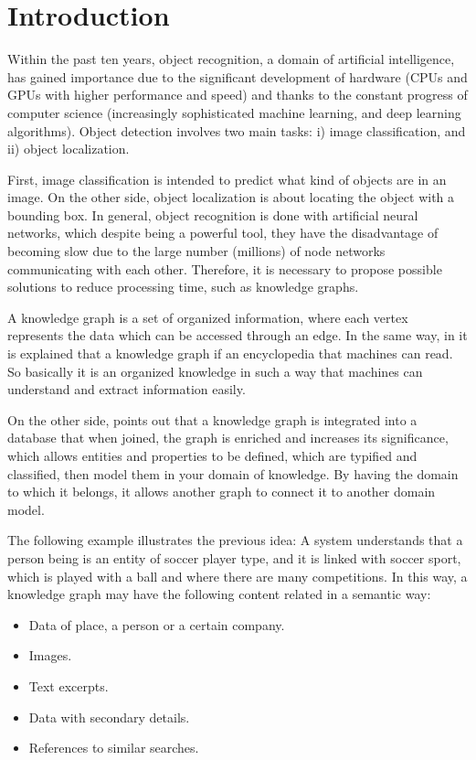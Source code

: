 \section{Introduction}
Within the past ten years, object recognition, a domain of artificial intelligence, has gained importance due to the significant development of hardware (CPUs and GPUs with higher performance and speed) and thanks to the constant progress of computer science (increasingly sophisticated machine learning, and deep learning algorithms). Object detection involves two main tasks: i) image classification, and ii) object localization.

First, image classification is intended to predict what kind of objects are in an image. On the other side, object localization is about locating the object with a bounding box. In general, object recognition is done with artificial neural networks, which despite being a powerful tool, they have the disadvantage of becoming slow due to the large number (millions) of node networks communicating with each other. Therefore, it is necessary to propose possible solutions to reduce processing time, such as knowledge graphs.

A knowledge graph is a set of organized information, where each vertex represents the data which can be accessed through an edge. In the same way, in \cite{Barnard} it is explained that a knowledge graph if an encyclopedia that machines can read. So basically it is an organized knowledge in such a way that machines can understand and extract information easily.

On the other side, \cite{Saorin} points out that a knowledge graph is integrated into a database that when joined, the graph is enriched and increases its significance, which allows entities and properties to be defined, which are typified and classified, then model them in your domain of knowledge. By having the domain to which it belongs, it allows another graph to connect it to another domain model.

The following example illustrates the previous idea: A system understands that a person being is an entity of soccer player type, and it is linked with soccer sport, which is played with a ball and where there are many competitions. In this way, a knowledge graph may have the following content related in a semantic way:

\begin{itemize}
\item Data of place, a person or a certain company.
\item Images.
\item Text excerpts.
\item Data with secondary details.
\item References to similar searches.
\end{itemize}

